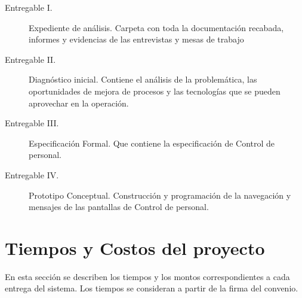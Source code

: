 \documentclass[10pt]{book}
\newcommand{\nombreProyecto}{ Control de personal}
\begin{document}
\begin{description}
	\item [Entregable I.] Expediente de análisis. Carpeta con toda la documentación recabada, informes y evidencias de las entrevistas y mesas de trabajo
	\item [Entregable II.] Diagnóstico inicial. Contiene el análisis de la problemática, las oportunidades de mejora de procesos y las tecnologías que se pueden aprovechar en la operación.
	\item [Entregable III.] Especificación Formal. Que contiene la especificación de \nombreProyecto.
	\item [Entregable IV.] Prototipo Conceptual. Construcción y programación de la navegación y mensajes de las pantallas de \nombreProyecto.
\end{description}


\section{Tiempos y Costos del proyecto}

	En esta sección se describen los tiempos y los montos correspondientes a cada entrega del sistema. Los  tiempos se consideran a partir de la firma del convenio.\\


\clossing
\end{document}
